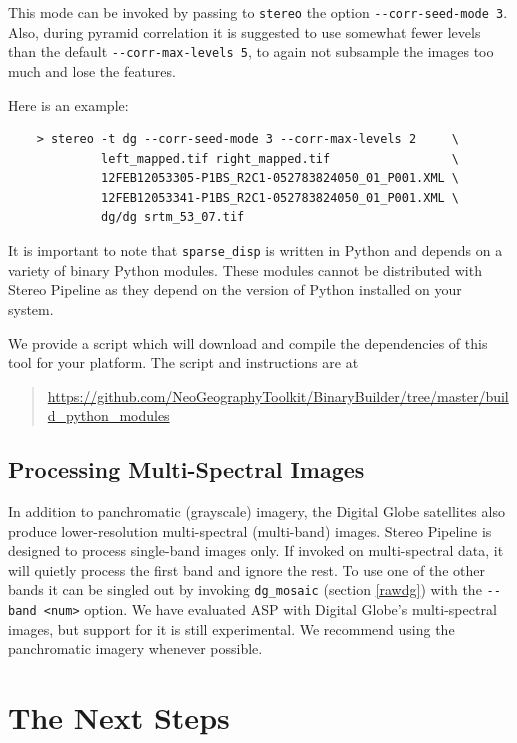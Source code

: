 This mode can be invoked by passing to \texttt{stereo} the option
\texttt{-\/-corr-seed-mode 3}. Also, during pyramid correlation it is
suggested to use somewhat fewer levels than the default
\texttt{-\/-corr-max-levels 5}, to again not subsample the images too much
and lose the features.

Here is an example:

\begin{verbatim}
    > stereo -t dg --corr-seed-mode 3 --corr-max-levels 2     \
             left_mapped.tif right_mapped.tif                 \
             12FEB12053305-P1BS_R2C1-052783824050_01_P001.XML \
             12FEB12053341-P1BS_R2C1-052783824050_01_P001.XML \
             dg/dg srtm_53_07.tif
\end{verbatim}

It is important to note that \texttt{sparse\_disp} is written in Python
and depends on a variety of binary Python modules. These modules cannot
be distributed with Stereo Pipeline as they depend on the version of
Python installed on your system.

We provide a script which will download and compile the dependencies of
this tool for your platform. The script and instructions are at

\begin{quote}
\indent \href{https://github.com/NeoGeographyToolkit/BinaryBuilder/tree/master/build\_python\_modules}{https://github.com/NeoGeographyToolkit/BinaryBuilder/tree/master/build\_python\_modules}
\end{quote}

\section{Processing Multi-Spectral Images}

In addition to panchromatic (grayscale) imagery, the Digital Globe
satellites also produce lower-resolution multi-spectral (multi-band)
images. Stereo Pipeline is designed to process single-band images
only. If invoked on multi-spectral data, it will quietly process the
first band and ignore the rest. To use one of the other
bands it can be singled out by invoking \texttt{dg\_mosaic}
(section \ref{rawdg}) with the \texttt{-\/-band <num>} option. We have
evaluated ASP with Digital Globe's multi-spectral images, but
support for it is still experimental. We recommend using the
panchromatic imagery whenever possible.

\chapter{The Next Steps}
\label{nextsteps}

